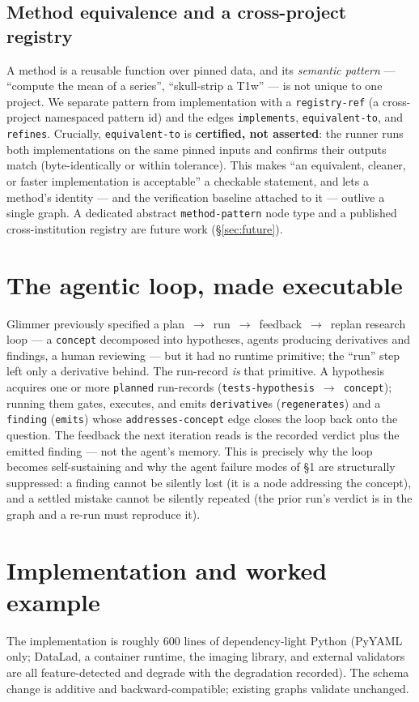 \documentclass[preprint]{glimmer-paper}
\newcommand{\code}[1]{\texttt{#1}}
\begin{document}
\subsection{Method equivalence and a cross-project registry}
\label{sec:registry}
A method is a reusable function over pinned data, and its \emph{semantic pattern} --- ``compute
the mean of a series'', ``skull-strip a T1w'' --- is not unique to one project. We separate
pattern from implementation with a \code{registry-ref} (a cross-project namespaced pattern
id) and the edges \code{implements}, \code{equivalent-to}, and \code{refines}. Crucially,
\code{equivalent-to} is \textbf{certified, not asserted}: the runner runs both
implementations on the same pinned inputs and confirms their outputs match (byte-identically
or within tolerance). This makes ``an equivalent, cleaner, or faster implementation is
acceptable'' a checkable statement, and lets a method's identity --- and the verification
baseline attached to it --- outlive a single graph. A dedicated abstract
\code{method-pattern} node type and a published cross-institution registry are future work
(\S\ref{sec:future}).

\section{The agentic loop, made executable}
\label{sec:loop}
Glimmer previously specified a plan~$\rightarrow$~run~$\rightarrow$~feedback~$\rightarrow$~replan
research loop --- a \code{concept} decomposed into hypotheses, agents producing derivatives
and findings, a human reviewing --- but it had no runtime primitive; the ``run'' step left
only a derivative behind. The run-record \emph{is} that primitive. A hypothesis acquires one
or more \code{planned} run-records (\code{tests-hypothesis}~$\rightarrow$~\code{concept});
running them gates, executes, and emits \code{derivative}s (\code{regenerates}) and a
\code{finding} (\code{emits}) whose \code{addresses-concept} edge closes the loop back onto
the question. The feedback the next iteration reads is the recorded verdict plus the emitted
finding --- not the agent's memory. This is precisely why the loop becomes self-sustaining and
why the agent failure modes of \S1 are structurally suppressed: a finding cannot be silently
lost (it is a node addressing the concept), and a settled mistake cannot be silently repeated
(the prior run's verdict is in the graph and a re-run must reproduce it).

\section{Implementation and worked example}
\label{sec:impl}
The implementation is roughly 600 lines of dependency-light Python (PyYAML only; DataLad, a
container runtime, the imaging library, and external validators are all feature-detected and
degrade with the degradation recorded). The schema change is additive and
backward-compatible; existing graphs validate unchanged.
\end{document}

